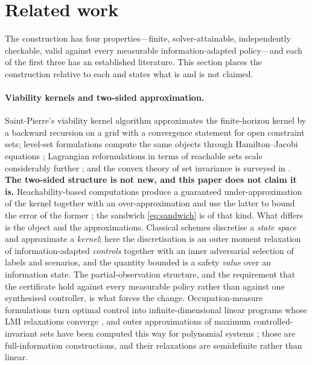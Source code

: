 \section{Related work}\label{sec:related}

The construction has four properties---finite, solver-attainable, independently checkable, valid against every measurable information-adapted policy---and each of the first three has an established literature. This section places the construction relative to each and states what is and is not claimed.

\paragraph{Viability kernels and two-sided approximation.}
Saint-Pierre's viability kernel algorithm \cite{SaintPierre1994} approximates the finite-horizon kernel by a backward recursion on a grid with a convergence statement for open constraint sets; level-set formulations compute the same objects through Hamilton--Jacobi equations \cite{MitchellBayenTomlin2005}; Lagrangian reformulations in terms of reachable sets scale considerably further \cite{Maidens2013}; and the convex theory of set invariance is surveyed in \cite{Blanchini1999}. \textbf{The two-sided structure is not new, and this paper does not claim it is.} Reachability-based computations produce a guaranteed under-approximation of the kernel together with an over-approximation and use the latter to bound the error of the former \cite[Section~3]{Maidens2013}; the sandwich \eqref{eq:sandwich} is of that kind. What differs is the object and the approximations. Classical schemes discretise a \emph{state space} and approximate a \emph{kernel}; here the discretisation is an outer moment relaxation of information-adapted \emph{controls} together with an inner adversarial selection of labels and scenarios, and the quantity bounded is a safety \emph{value} over an information state. The partial-observation structure, and the requirement that the certificate hold against every measurable policy rather than against one synthesised controller, is what forces the change. Occupation-measure formulations turn optimal control into infinite-dimensional linear programs \cite{Vinter1993} whose LMI relaxations converge \cite{Lasserre2008}, and outer approximations of maximum controlled-invariant sets have been computed this way for polynomial systems \cite{Korda2014}; those are full-information constructions, and their relaxations are semidefinite rather than linear.

